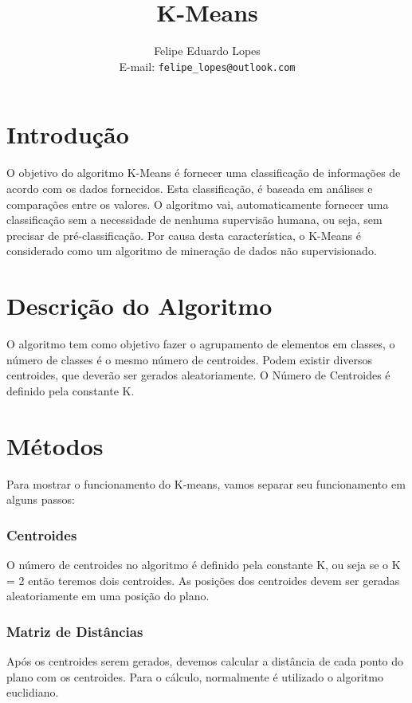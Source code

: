 \documentclass[a4paper,11pt]{article}
\title{K-Means}
\author{Felipe Eduardo Lopes\\E-mail: {\tt felipe\_lopes@outlook.com}}
\date{}
\begin{document}
\graphicspath{ {} }
\maketitle

\begin{multicols}{2}

\section{Introdução}
O objetivo do algoritmo K-Means é fornecer uma classificação de informações de acordo com os dados fornecidos. Esta classificação, é baseada em análises e comparações entre os valores. O algoritmo vai, automaticamente fornecer uma classificação sem a necessidade de nenhuma supervisão humana, ou seja, sem precisar de pré-classificação. Por causa desta característica, o K-Means é considerado como um algoritmo de mineração de dados não supervisionado.\cite{ref:chibelushi2003}

\section{Descrição do Algoritmo}
O algoritmo tem como objetivo fazer o agrupamento de elementos em classes, o número de classes é o mesmo número de centroides. Podem existir diversos centroides, que deverão ser gerados aleatoriamente. O Número de Centroides é definido pela constante K. 

\section{Métodos}
Para mostrar o funcionamento do K-means, vamos separar seu funcionamento em alguns passos:\\

\subsubsection{Centroides}
O número de centroides no algoritmo é definido pela constante K, ou seja se o K = 2 então teremos dois centroides. As posições dos centroides devem ser geradas aleatoriamente em uma posição do plano.

\subsubsection{Matriz de Distâncias}
Após os centroides serem gerados, devemos calcular a distância de cada ponto do plano com os centroides. Para o cálculo, normalmente é utilizado o algoritmo euclidiano.


\end{multicols}
\end{document}
